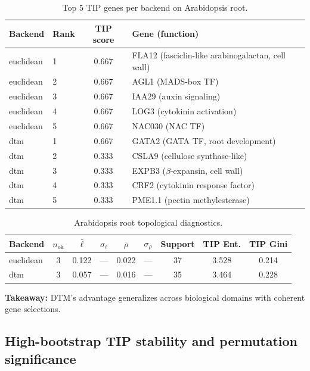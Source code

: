 \documentclass[12pt]{article}
\begin{document}
\begin{table}[h]
\centering\small
\begin{tabular}{llcl}
\toprule
Backend & Rank & TIP score & Gene (function) \\
\midrule
euclidean & 1 & 0.667 & FLA12 (fasciclin-like arabinogalactan, cell wall) \\
euclidean & 2 & 0.667 & AGL1 (MADS-box TF) \\
euclidean & 3 & 0.667 & IAA29 (auxin signaling) \\
euclidean & 4 & 0.667 & LOG3 (cytokinin activation) \\
euclidean & 5 & 0.667 & NAC030 (NAC TF) \\
\midrule
dtm & 1 & 0.667 & GATA2 (GATA TF, root development) \\
dtm & 2 & 0.333 & CSLA9 (cellulose synthase-like) \\
dtm & 3 & 0.333 & EXPB3 ($\beta$-expansin, cell wall) \\
dtm & 4 & 0.333 & CRF2 (cytokinin response factor) \\
dtm & 5 & 0.333 & PME1.1 (pectin methylesterase) \\
\bottomrule
\end{tabular}
\caption{Top 5 TIP genes per backend on Arabidopsis root.}
\label{tab:arab_genes}
\end{table}

\begin{table}[h]
\centering\small
\begin{tabular}{@{}lcccccccc@{}}
\toprule
Backend & $n_{\text{ok}}$ & $\bar{\ell}$ & $\sigma_\ell$ & $\bar{\rho}$ & $\sigma_\rho$ & Support & TIP Ent. & TIP Gini \\
\midrule
euclidean & 3 & 0.122 & --- & 0.022 & --- & 37 & 3.528 & 0.214 \\
dtm & 3 & 0.057 & --- & 0.016 & --- & 35 & 3.464 & 0.228 \\
\bottomrule
\end{tabular}
\caption{Arabidopsis root topological diagnostics.}
\label{tab:diag_arab}
\end{table}

\textbf{Takeaway:} DTM's advantage generalizes across biological domains with coherent gene selections.

\subsection{High-bootstrap TIP stability and permutation significance}
\label{sec:highboot}
\end{document}

